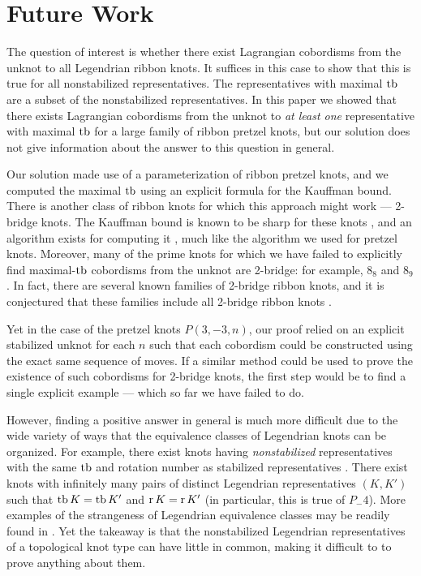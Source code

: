 \chapter{Future Work}\label{ch:future}

The question of interest is whether there exist Lagrangian cobordisms from the unknot to all Legendrian ribbon knots. It suffices in this case to show that this is true for all nonstabilized representatives. The representatives with maximal $\operatorname{tb}$ are a subset of the nonstabilized representatives.
In this paper we showed that there exists Lagrangian cobordisms from the unknot to \emph{at least one} representative with maximal $\operatorname{tb}$ for a large family of ribbon pretzel knots, but our solution does not give information about the answer to this question in general. 

Our solution made use of a parameterization of ribbon pretzel knots, and we computed the maximal $\operatorname{tb}$ using an explicit formula for the Kauffman bound. There is another class of ribbon knots for which this approach might work --- 2-bridge knots.
The Kauffman bound is known to be sharp for these knots \cite{ng}, and an algorithm exists for computing it \cite{luzhong-2bridge}, much like the algorithm we used for pretzel knots.
Moreover, many of the prime knots for which we have failed to explicitly find maximal-$\operatorname{tb}$ cobordisms from the unknot are 2-bridge: for example, $8_8$ and $8_9$. In fact, there are several known families of 2-bridge ribbon knots, and it is conjectured that these families include all 2-bridge ribbon knots \cite{lamm}.

Yet in the case of the pretzel knots $P(3, -3, n)$, our proof relied on an explicit stabilized unknot for each $n$ such that each cobordism could be constructed using the exact same sequence of moves.
If a similar method could be used to prove the existence of such cobordisms for 2-bridge knots, the first step would be to find a single explicit example --- which so far we have failed to do.

However, finding a positive answer in general is much more difficult due to the wide variety of ways that the equivalence classes of Legendrian knots can be organized. For example, there exist knots having \emph{nonstabilized} representatives with the same $\operatorname{tb}$ and rotation number as stabilized representatives \cite{mountain}. There exist knots with infinitely many pairs of distinct Legendrian representatives $(K, K')$ such that $\operatorname{tb} K = \operatorname{tb} K'$ and $\operatorname{r} K = \operatorname{r} K'$ (in particular, this is true of $P_-4$). More examples of the strangeness of Legendrian equivalence classes may be readily found in \cite{atlas}. Yet the takeaway is that the nonstabilized Legendrian representatives of a topological knot type can have little in common, making it difficult to to prove anything about them.


